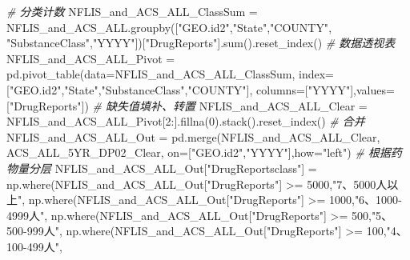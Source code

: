 \documentclass[
]{article}
\newenvironment{Shaded}{}{}
\newcommand{\BuiltInTok}[1]{#1}
\newcommand{\CommentTok}[1]{\textcolor[rgb]{0.38,0.63,0.69}{\textit{#1}}}
\newcommand{\DecValTok}[1]{\textcolor[rgb]{0.25,0.63,0.44}{#1}}
\newcommand{\NormalTok}[1]{#1}
\newcommand{\OperatorTok}[1]{\textcolor[rgb]{0.40,0.40,0.40}{#1}}
\newcommand{\StringTok}[1]{\textcolor[rgb]{0.25,0.44,0.63}{#1}}
\begin{document}
\begin{Shaded}
\begin{Highlighting}[]
\CommentTok{\# 分类计数}
\NormalTok{NFLIS\_and\_ACS\_ALL\_ClassSum }\OperatorTok{=}\NormalTok{ NFLIS\_and\_ACS\_ALL.groupby([}\StringTok{"GEO.id2"}\NormalTok{,}\StringTok{"State"}\NormalTok{,}\StringTok{"COUNTY"}\NormalTok{,}
                                                        \StringTok{"SubstanceClass"}\NormalTok{,}\StringTok{"YYYY"}\NormalTok{])[}\StringTok{"DrugReports"}\NormalTok{].}\BuiltInTok{sum}\NormalTok{().reset\_index()}
\CommentTok{\# 数据透视表}
\NormalTok{NFLIS\_and\_ACS\_ALL\_Pivot }\OperatorTok{=}\NormalTok{ pd.pivot\_table(data}\OperatorTok{=}\NormalTok{NFLIS\_and\_ACS\_ALL\_ClassSum,}
\NormalTok{                                         index}\OperatorTok{=}\NormalTok{[}\StringTok{"GEO.id2"}\NormalTok{,}\StringTok{"State"}\NormalTok{,}\StringTok{"SubstanceClass"}\NormalTok{,}\StringTok{"COUNTY"}\NormalTok{],}
\NormalTok{                                         columns}\OperatorTok{=}\NormalTok{[}\StringTok{"YYYY"}\NormalTok{],values}\OperatorTok{=}\NormalTok{[}\StringTok{"DrugReports"}\NormalTok{])}
\CommentTok{\# 缺失值填补、转置}
\NormalTok{NFLIS\_and\_ACS\_ALL\_Clear }\OperatorTok{=}\NormalTok{ NFLIS\_and\_ACS\_ALL\_Pivot[}\DecValTok{2}\NormalTok{:].fillna(}\DecValTok{0}\NormalTok{).stack().reset\_index()}
 \CommentTok{\# 合并}
\NormalTok{NFLIS\_and\_ACS\_ALL\_Out }\OperatorTok{=}\NormalTok{ pd.merge(NFLIS\_and\_ACS\_ALL\_Clear,}
\NormalTok{                                 ACS\_ALL\_5YR\_DP02\_Clear,}
\NormalTok{                                 on}\OperatorTok{=}\NormalTok{[}\StringTok{"GEO.id2"}\NormalTok{,}\StringTok{"YYYY"}\NormalTok{],how}\OperatorTok{=}\StringTok{"left"}\NormalTok{)}
\CommentTok{\# 根据药物量分层}
\NormalTok{NFLIS\_and\_ACS\_ALL\_Out[}\StringTok{"DrugReportsclass"}\NormalTok{] }\OperatorTok{=}\NormalTok{ np.where(NFLIS\_and\_ACS\_ALL\_Out[}\StringTok{"DrugReports"}\NormalTok{] }\OperatorTok{\textgreater{}=} \DecValTok{5000}\NormalTok{,}\StringTok{"7、5000人以上"}\NormalTok{,}
\NormalTok{                                             np.where(NFLIS\_and\_ACS\_ALL\_Out[}\StringTok{"DrugReports"}\NormalTok{] }\OperatorTok{\textgreater{}=} \DecValTok{1000}\NormalTok{,}\StringTok{"6、1000{-}4999人"}\NormalTok{,}
\NormalTok{                                                      np.where(NFLIS\_and\_ACS\_ALL\_Out[}\StringTok{"DrugReports"}\NormalTok{] }\OperatorTok{\textgreater{}=} \DecValTok{500}\NormalTok{,}\StringTok{"5、500{-}999人"}\NormalTok{,}
\NormalTok{                                                               np.where(NFLIS\_and\_ACS\_ALL\_Out[}\StringTok{"DrugReports"}\NormalTok{] }\OperatorTok{\textgreater{}=} \DecValTok{100}\NormalTok{,}\StringTok{"4、100{-}499人"}\NormalTok{, }

\end{Highlighting}
\end{Shaded}
\end{document}
